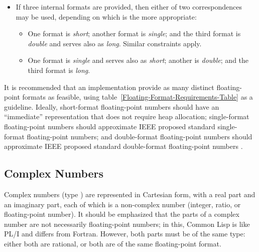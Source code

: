 \begin{itemize}
\item
If three internal formats are provided, then either of two correspondences
may be used, depending on which is the more appropriate:
\begin{itemize}
\item
One format is \emph{short}; another format is \emph{single}; and the third format is
\emph{double} and serves also as \emph{long}.  Similar constraints apply.

\item
One format is \emph{single} and serves also as \emph{short};
another is \emph{double}; and the third format is \emph{long}.
\end{itemize}
\end{itemize}

\beforenoterule
\begin{implementation}
It is recommended that an implementation
provide as many distinct floating-point formats as feasible,
using table~\ref{Floating-Format-Requirements-Table} as a guideline.
Ideally, short-format floating-point numbers should have an
``immediate'' representation that does not require heap allocation;
single-format
floating-point numbers should approximate IEEE proposed standard
single-format floating-point numbers; and double-format floating-point
numbers should approximate IEEE proposed standard double-format
floating-point numbers
\cite{IEEE-PROPOSED-FLOATING-POINT-STANDARD,IEEE-FLOATING-POINT-IMPL-GUIDE,IEEE-FLOATING-POINT-IMPL-GUIDE-ERRATA}.
\end{implementation}
\afternoterule


\subsection{Complex Numbers}

Complex numbers (type )
are represented in Cartesian form, with a real part and an imaginary
part, each of which is a non-complex number (integer, ratio, or floating-point
number).  It should be emphasized that the parts of a complex
number are not necessarily floating-point numbers; in this, Common Lisp
is like PL/I and differs from Fortran.  However, both parts must
be of the same type: either both are rational, or both are of the
same floating-point format. 

